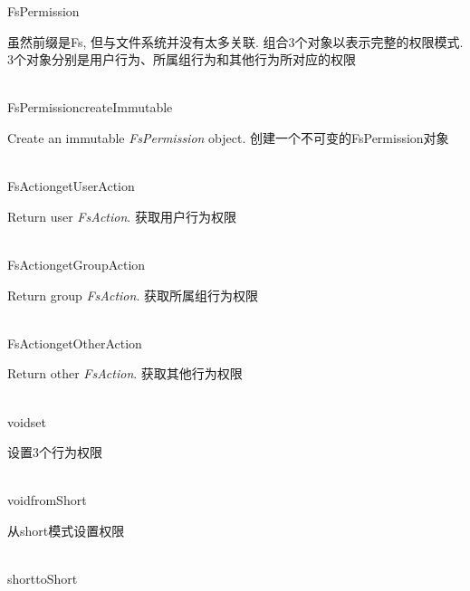 \begin{XeClass}{FsPermission}
   
 虽然前缀是Fs, 但与文件系统并没有太多关联.
 组合3个对象以表示完整的权限模式.
 3个对象分别是用户行为、所属组行为和其他行为所对应的权限

  \begin{XeMethod}{\XePublic\\ }{FsPermission}{createImmutable}
       
 Create an immutable \emph{FsPermission} object.
 创建一个不可变的FsPermission对象

  \end{XeMethod}

  \begin{XeMethod}{\XePublic\\ }{FsAction}{getUserAction}
       
 Return user \emph{FsAction}.
 获取用户行为权限

  \end{XeMethod}

  \begin{XeMethod}{\XePublic\\ }{FsAction}{getGroupAction}
       
 Return group \emph{FsAction}.
 获取所属组行为权限

  \end{XeMethod}

  \begin{XeMethod}{\XePublic\\ }{FsAction}{getOtherAction}
       
 Return other \emph{FsAction}.
 获取其他行为权限

  \end{XeMethod}

  \begin{XeMethod}{\XePrivate\\ }{void}{set}
       
 设置3个行为权限

  \end{XeMethod}

  \begin{XeMethod}{\XePublic\\ }{void}{fromShort}
       
 从short模式设置权限

  \end{XeMethod}

  \begin{XeMethod}{\XePublic\\ }{short}{toShort}
       

\end{XeMethod}
\end{XeClass}
